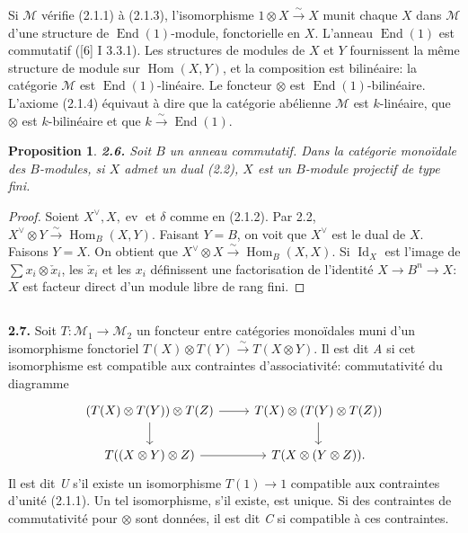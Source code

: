 \documentclass[12pt,a4paper]{article}
\theoremstyle{plain}
\newtheorem{proposition}[theorem]{Proposition}
\theoremstyle{definition}
\theoremstyle{remark}
\DeclareMathOperator{\Hom}{Hom}
\DeclareMathOperator{\End}{End}
\DeclareMathOperator{\Id}{Id}
\DeclareMathOperator{\ev}{ev}
\begin{document}
Si $\mathcal{M}$ vérifie (2.1.1) à (2.1.3), l'isomorphisme $1 \otimes X \xrightarrow{\sim} X$ munit chaque $X$ dans $\mathcal{M}$ d'une structure de $\End(1)$-module, fonctorielle en $X$. L'anneau $\End(1)$ est commutatif ([6] I 3.3.1). Les structures de modules de $X$ et $Y$ fournissent la même structure de module sur $\Hom(X,Y)$, et la composition est bilinéaire: la catégorie $\mathcal{M}$ est $\End(1)$-linéaire. Le foncteur $\otimes$ est $\End(1)$-bilinéaire. L'axiome (2.1.4) équivaut à dire que la catégorie abélienne $\mathcal{M}$ est $k$-linéaire, que $\otimes$ est $k$-bilinéaire et que $k \xrightarrow{\sim} \End(1)$.

\begin{proposition}\label{prop:2.6}
\textbf{2.6.} Soit $B$ un anneau commutatif. Dans la catégorie monoïdale des $B$-modules, si $X$ admet un dual (2.2), $X$ est un $B$-module projectif de type fini.
\end{proposition}

\begin{proof}
Soient $X^\vee, X, \ev$ et $\delta$ comme en (2.1.2). Par 2.2, $X^\vee \otimes Y \xrightarrow{\sim} \Hom_B(X,Y)$. Faisant $Y = B$, on voit que $X^\vee$ est le dual de $X$. Faisons $Y = X$. On obtient que $X^\vee \otimes X \xrightarrow{\sim} \Hom_B(X,X)$. Si $\Id_X$ est l'image de $\sum x_i \otimes \check{x}_i$, les $\check{x}_i$ et les $x_i$ définissent une factorisation de l'identité $X \to B^n \to X$: $X$ est facteur direct d'un module libre de rang fini.
\end{proof}

\subsection{}

\textbf{2.7.} Soit $T : \mathcal{M}_1 \to \mathcal{M}_2$ un foncteur entre catégories monoïdales muni d'un isomorphisme fonctoriel $T(X) \otimes T(Y) \xrightarrow{\sim} T(X \otimes Y)$. Il est dit \emph{A} si cet isomorphisme est compatible aux contraintes d'associativité: commutativité du diagramme
\[
\begin{tikzcd}
(T(X) \otimes T(Y)) \otimes T(Z) \arrow[r] \arrow[d] & T(X) \otimes (T(Y) \otimes T(Z)) \arrow[d] \\
T((X \otimes Y) \otimes Z) \arrow[r] & T(X \otimes (Y \otimes Z)).
\end{tikzcd}
\]
Il est dit \emph{U} s'il existe un isomorphisme $T(1) \to 1$ compatible aux contraintes d'unité (2.1.1). Un tel isomorphisme, s'il existe, est unique. Si des contraintes de commutativité pour $\otimes$ sont données, il est dit \emph{C} si compatible à ces contraintes.
\end{document}
